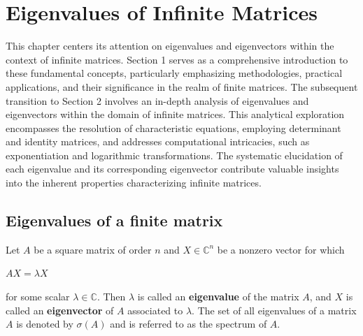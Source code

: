 \chapter{Eigenvalues of Infinite Matrices}
This chapter centers its attention on eigenvalues and eigenvectors within the context of infinite matrices. Section 1 serves as a comprehensive introduction to these fundamental concepts, particularly emphasizing methodologies, practical applications, and their significance in the realm of finite matrices. The subsequent transition to Section 2 involves an in-depth analysis of eigenvalues and eigenvectors within the domain of infinite matrices. This analytical exploration encompasses the resolution of characteristic equations, employing determinant and identity matrices, and addresses computational intricacies, such as exponentiation and logarithmic transformations. The systematic elucidation of each eigenvalue and its corresponding eigenvector contribute valuable insights into the inherent properties characterizing infinite matrices.



\section{Eigenvalues of a finite matrix}
\label{sec:intro_eigen}


Let $A$ be a square matrix of order $n$ and ${X} \in \mathbb{C}^n $ be a nonzero vector for which
\begin{center}
    $A{X} = \lambda {X} $
\end{center}
for some scalar $ \lambda \in \mathbb{C}$. Then $ \lambda $ is called an \textbf{eigenvalue} of the matrix $ A $, and $ {X} $ is called an \textbf{eigenvector} of $ A $ associated to $ \lambda $. The set of all eigenvalues of a matrix $ A $ is denoted by $ \sigma(A) $ and is referred to as the spectrum of $ A $.    


